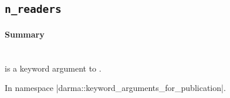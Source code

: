 \subsection{\texttt{n\_readers}}


\paragraph{Summary}\mbox{}\\ 
 is a \gls{keyword argument} to .  %

In namespace |darma::keyword_arguments_for_publication|.

%
%
%
%
%
%




